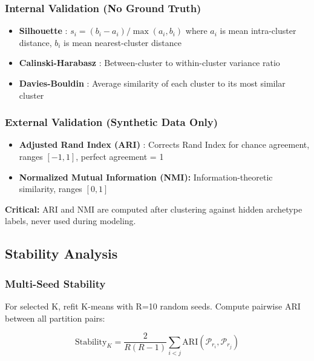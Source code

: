 \documentclass[11pt,a4paper]{article}
\begin{document}
\subsubsection{Internal Validation (No Ground Truth)}

\begin{itemize}
    \item \textbf{Silhouette} \cite{rousseeuw1987silhouettes}: $s_i = (b_i - a_i) / \max(a_i, b_i)$ where $a_i$ is mean intra-cluster distance, $b_i$ is mean nearest-cluster distance
    \item \textbf{Calinski-Harabasz} \cite{calinski1974dendrite}: Between-cluster to within-cluster variance ratio
    \item \textbf{Davies-Bouldin} \cite{davies1979cluster}: Average similarity of each cluster to its most similar cluster
\end{itemize}

\subsubsection{External Validation (Synthetic Data Only)}

\begin{itemize}
    \item \textbf{Adjusted Rand Index (ARI)} \cite{gates2019adjusted}: Corrects Rand Index for chance agreement, ranges $[-1, 1]$, perfect agreement = 1
    \item \textbf{Normalized Mutual Information (NMI):} Information-theoretic similarity, ranges $[0, 1]$
\end{itemize}

\textbf{Critical:} ARI and NMI are computed after clustering against hidden archetype labels, never used during modeling.

\subsection{Stability Analysis}
\label{sec:stability}

\subsubsection{Multi-Seed Stability}

For selected K, refit K-means with R=10 random seeds. Compute pairwise ARI between all partition pairs:

\begin{equation}
\text{Stability}_K = \frac{2}{R(R-1)} \sum_{i < j} \text{ARI}(\mathcal{P}_{r_i}, \mathcal{P}_{r_j})
\end{equation}
\end{document}
